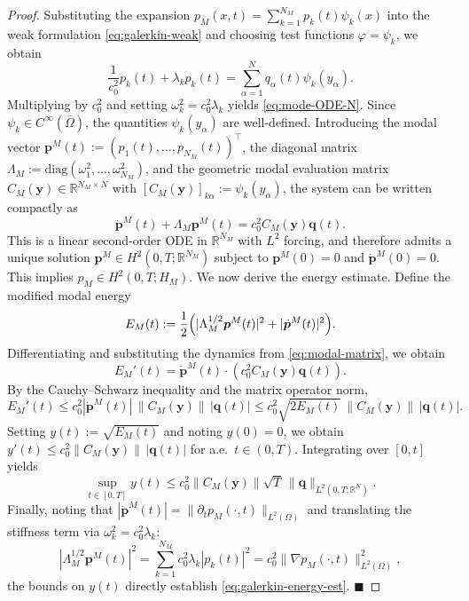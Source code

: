\documentclass[10pt,a4paper]{amsart}
\begin{document}
\begin{proof}
Substituting the expansion $p_M(x,t)=\sum\limits_{k=1}^{N_M} p_k(t)\psi_k(x)$ into the weak formulation \eqref{eq:galerkin-weak} and choosing test functions $\varphi=\psi_k$, we obtain
\[
\frac{1}{c_0^2}\ddot p_k(t) + \lambda_k p_k(t)
= \sum_{\alpha=1}^N q_\alpha(t)\psi_k(y_\alpha).
\]
Multiplying by $c_0^2$ and setting $\omega_k^2=c_0^2\lambda_k$ yields \eqref{eq:mode-ODE-N}. Since $\psi_k\in C^\infty(\overline{\Omega})$, the quantities $\psi_k(y_\alpha)$ are well-defined. 
\newline
Introducing the modal vector $\bm p^M(t):=(p_1(t),\dots,p_{N_M}(t))^\top$, the diagonal matrix $\Lambda_M:=\mathrm{diag}(\omega_1^2,\dots,\omega_{N_M}^2)$, and the geometric modal evaluation matrix $C_M(\mathbf y)\in\mathbb R^{N_M\times N}$ with $[C_M(\mathbf y)]_{k\alpha}:=\psi_k(y_\alpha)$, the system can be written compactly as
\begin{equation}\label{eq:modal-matrix}
\ddot{\bm p}^M(t)+\Lambda_M\bm p^M(t)=c_0^2 C_M(\mathbf y)\mathbf q(t).
\end{equation}
This is a linear second-order ODE in $\mathbb{R}^{N_M}$ with $L^2$ forcing, and therefore admits a unique solution $\bm p^M\in H^2(0,T;\mathbb{R}^{N_M})$ subject to $\bm p^M(0)=0$ and $\dot{\bm p}^M(0)=0$. This implies $p_M\in H^2(0,T;H_M)$. 
\noindent
We now derive the energy estimate. Define the modified modal energy
\[
E_M(t):=\frac12\Bigl(|\Lambda_M^{1/2}\bm p^M(t)|^2+|\dot{\bm p}^M(t)|^2\Bigr).
\]
Differentiating and substituting the dynamics from \eqref{eq:modal-matrix}, we obtain
\[
E_M'(t)=\dot{\bm p}^M(t)\cdot (c_0^2 C_M(\mathbf y)\mathbf q(t)).
\]
By the Cauchy--Schwarz inequality and the matrix operator norm,
\[
E_M'(t)\le c_0^2 |\dot{\bm p}^M(t)|\,\|C_M(\mathbf y)\|\,|\mathbf q(t)|
\le c_0^2 \sqrt{2E_M(t)}\,\|C_M(\mathbf y)\|\,|\mathbf q(t)|.
\]
Setting $y(t):=\sqrt{E_M(t)}$ and noting $y(0)=0$, we obtain $y'(t)\le c_0^2 \|C_M(\mathbf y)\|\,|\mathbf q(t)|$ for a.e.\ $t\in(0,T)$. Integrating over $[0,t]$ yields
\[
\sup_{t\in[0,T]} y(t) \le c_0^2 \|C_M(\mathbf y)\|\sqrt{T}\,\|\mathbf q\|_{L^2(0,T;\mathbb R^N)}.
\]
Finally, noting that $|\dot{\bm p}^M(t)| = \|\partial_t p_M(\cdot,t)\|_{L^2(\Omega)}$ and translating the stiffness term via $\omega_k^2 = c_0^2\lambda_k$:
\[
|\Lambda_M^{1/2}\bm p^M(t)|^2 = \sum_{k=1}^{N_M} c_0^2\lambda_k |p_k(t)|^2 = c_0^2 \|\nabla p_M(\cdot,t)\|_{L^2(\Omega)}^2,
\]
the bounds on $y(t)$ directly establish \eqref{eq:galerkin-energy-est}. \hfill $\blacksquare$
\end{proof}
\end{document}
